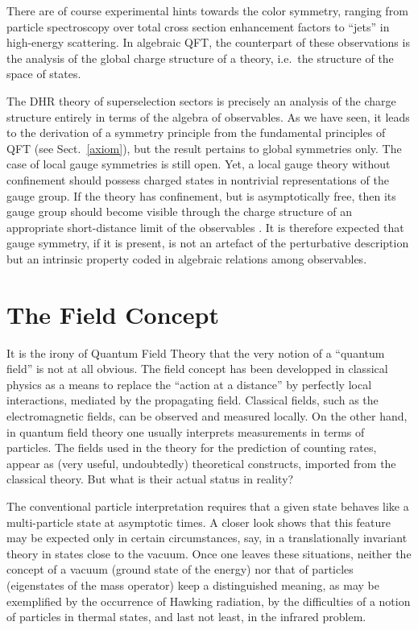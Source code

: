 \documentclass[multphys,vecphys]{svmult}
\begin{document}
There are of course experimental hints towards the color symmetry, 
ranging from particle spectroscopy over total cross
section enhancement factors to ``jets'' in
high-energy scattering. In algebraic QFT, the counterpart of these observations is the analysis 
of the global charge structure of a theory, i.e.\ the structure of the
space of states. 

The DHR theory of
superselection sectors is precisely an
analysis of the charge structure entirely in terms of the algebra of
observables. As we have seen, it leads to the derivation of a symmetry
principle from the fundamental principles of QFT (see
Sect.~\ref{axiom}), but the result pertains to global symmetries
only. The case of local gauge symmetries is still open. Yet, a local
gauge theory without confinement should possess
charged states in nontrivial representations of the gauge group. If
the theory has confinement, but is asymptotically free, then its gauge group should become visible
through the charge structure of an appropriate short-distance limit of
the observables \cite{BH}. It is therefore expected that gauge
symmetry, if it is present, is not an artefact of the perturbative
description but an intrinsic property coded in
algebraic relations among observables. 

\section{The Field Concept}\label{field}

It is the irony of Quantum Field Theory that the very notion of a
``quantum field'' is not at all obvious. The field concept has been
developped in classical physics as a means to replace the
``action at a distance'' by perfectly
local interactions, mediated by the propagating
field. Classical fields, such as the electromagnetic fields, can be
observed and measured locally. On the other hand, in quantum field
theory one usually interprets measurements in terms of
particles. The fields used in the theory for the
prediction of counting rates, appear as (very useful, undoubtedly)
theoretical constructs, imported from the classical theory. But what
is their actual status in reality?   

The conventional particle interpretation requires that
a given state behaves like a multi-particle state at asymptotic
times. A closer look shows that this feature may be expected only in
certain circumstances, say, in a translationally invariant theory in
states close to the vacuum. Once one leaves these situations, neither
the concept of a vacuum (ground state of the
energy) nor that of particles (eigenstates of the mass operator) keep
a distinguished meaning, as may be exemplified by the occurrence of
Hawking radiation, by the difficulties of a
notion of particles in thermal states, and last
not least, in the infrared problem. 
\end{document}
